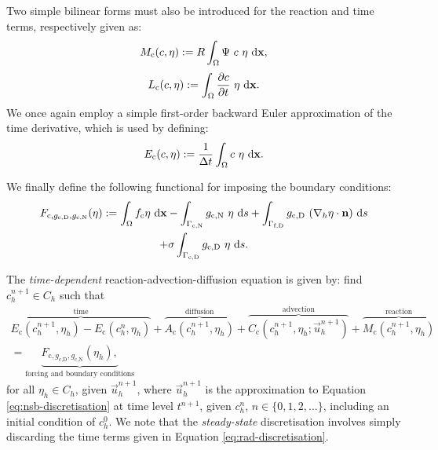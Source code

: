             Two simple bilinear forms must also be introduced for the reaction and time terms, respectively given as:
            \begin{equation}
                M_\text{c}(c, \eta) := R \int_\Omega \Psi ~ c ~ \eta ~\mathrm{d} \boldsymbol{\mathbf{x}},
            \end{equation}
            \begin{equation}
                L_\text{c}(c, \eta) := \int_\Omega \pdv{c}{t} ~ \eta ~\mathrm{d} \boldsymbol{\mathbf{x}}.
                \label{eq:rad-wf-time}
            \end{equation}
            We once again employ a simple first-order backward Euler approximation of the time derivative, which is used by defining:
            \begin{equation}
                E_\text{c}(c, \eta) := \frac{1}{\Delta t} \int_\Omega c ~ \eta ~\mathrm{d} \boldsymbol{\mathbf{x}}.
                \label{eq:rad-wf-time-euler}
            \end{equation}
    
            We finally define the following functional for imposing the boundary conditions:
            \begin{multline}
                F_{\text{c},g_\text{c,D}, g_\text{c,N}}(\eta) := \int_\Omega f_\text{c} \eta ~\mathrm{d}\boldsymbol{\mathbf{x}} - \int_{\Gamma_\text{c,N}} g_\text{c,N} ~ \eta ~\mathrm{d} s + \int_{\Gamma_\text{f,D}} g_\text{c,D} ~ (\nabla_h \eta \cdot \boldsymbol{\mathbf{n}}) ~\mathrm{d} s \\ + \sigma\int_{\Gamma_\text{c,D}} g_\text{c,D} ~ \eta ~\mathrm{d} s.
            \end{multline}           
            
            The \textit{time-dependent} reaction-advection-diffusion equation is given by: find $c^{n+1}_h \in C_h$ such that
            \begin{multline}
                \overbrace{E_\text{c}(c^{n+1}_h, \eta_h) - E_\text{c}(c^n_h, \eta_h)}^{\text{time}} + \overbrace{A_\text{c}(c^{n+1}_h, \eta_h)}^{\text{diffusion}} + \overbrace{C_\text{c}(c^{n+1}_h, \eta_h; \vec{u}^{n+1}_h)}^{\text{advection}} + \overbrace{M_\text{c}(c^{n+1}_h, \eta_h)}^{\text{reaction}} \\ = \underbrace{F_{\text{c},g_\text{c,D},g_\text{c,N}}(\eta_h),}_{\text{forcing and boundary conditions}}
                \label{eq:rad-discretisation}
            \end{multline}
            for all $\eta_h \in C_h$, given $\vec{u}^{n+1}_h$, where $\vec{u}^{n+1}_h$ is the approximation to Equation \eqref{eq:nsb-discretisation} at time level $t^{n+1}$, given $c^n_h$, $n \in \{0, 1, 2, ...\}$, including an initial condition of $c^0_h$. We note that the \textit{steady-state} discretisation involves simply discarding the time terms given in Equation \eqref{eq:rad-discretisation}.


